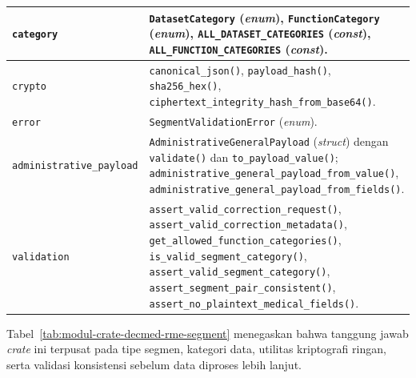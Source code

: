 \begin{longtable}{|>{\raggedright\arraybackslash}p{}|>{\raggedright\arraybackslash}p{}|}
	\texttt{category}
	               & \texttt{DatasetCategory} (\textit{enum}), \texttt{FunctionCategory} (\textit{enum}), \texttt{ALL\_DATASET\_CATEGORIES} (\textit{const}), \texttt{ALL\_FUNCTION\_CATEGORIES} (\textit{const}).
	\\ \hline

	\texttt{crypto}
	               & \texttt{canonical\_json()}, \texttt{payload\_hash()}, \texttt{sha256\_hex()}, \texttt{ciphertext\_integrity\_hash\_from\_base64()}.
	\\ \hline

	\texttt{error}
	               & \texttt{SegmentValidationError} (\textit{enum}).
	\\ \hline

	\texttt{administrative\newline \_payload}
	               & \texttt{AdministrativeGeneralPayload} (\textit{struct}) dengan \texttt{validate()} dan \texttt{to\_payload\_value()}; \texttt{administrative\_general\_payload\_from\_value()}, \texttt{administrative\_general\_payload\_from\_fields()}.
	\\ \hline

	\texttt{validation}
	               & \texttt{assert\_valid\_correction\_request()}, \texttt{assert\_valid\_correction\_metadata()}, \texttt{get\_allowed\_function\_categories()}, \texttt{is\_valid\_segment\_category()}, \texttt{assert\_valid\_segment\_category()}, \texttt{assert\_segment\_pair\_consistent()}, \texttt{assert\_no\_plaintext\_medical\_fields()}.
	\\ \hline
\end{longtable}
\endgroup

Tabel~\ref{tab:modul-crate-decmed-rme-segment} menegaskan bahwa tanggung jawab \textit{crate} ini terpusat pada tipe segmen, kategori data, utilitas kriptografi ringan, serta validasi konsistensi sebelum data diproses lebih lanjut.
